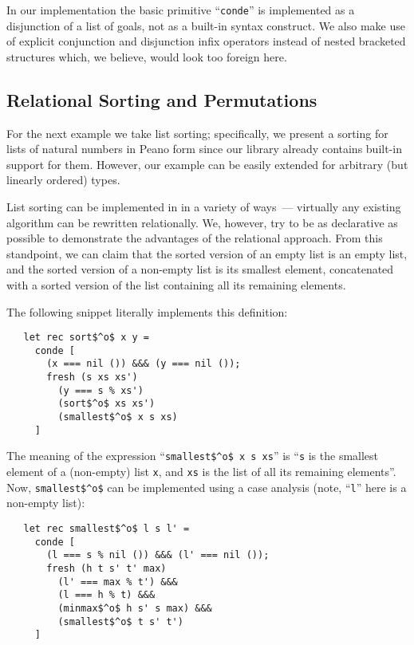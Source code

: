In our implementation the basic \miniKanren primitive ``\lstinline{conde}'' is implemented as a
disjunction of a list of goals, not as a built-in syntax construct. We also make use of explicit
conjunction and disjunction infix operators instead of nested bracketed structures which, we
believe, would look too foreign here.

\subsection{Relational Sorting and Permutations}

For the next example we take list sorting; specifically, we present a sorting for lists of natural numbers
in Peano form since our library already contains built-in support for them. However, our example can be
easily extended for arbitrary (but linearly ordered) types.

List sorting can be implemented in \miniKanren in a variety of ways~--- virtually any existing algorithm can
be rewritten relationally. We, however, try to be as declarative as possible to demonstrate the
advantages of the relational approach. From this standpoint, we can claim that the sorted version of an empty list is an
empty list, and the sorted version of a non-empty list is its smallest element, concatenated with a sorted
version of the list containing all its remaining elements.

The following snippet literally implements this definition:

\begin{lstlisting}
   let rec sort$^o$ x y =
     conde [
       (x === nil ()) &&& (y === nil ());
       fresh (s xs xs')
         (y === s % xs')
         (sort$^o$ xs xs')
         (smallest$^o$ x s xs)
     ]
\end{lstlisting}

The meaning of the expression ``\lstinline{smallest$^o$ x s xs}'' is ``\lstinline{s} is the smallest element of a (non-empty) list \lstinline{x}, and \lstinline{xs} is the
list of all its remaining elements''. Now, \lstinline{smallest$^o$} can be implemented using a case analysis (note, ``\lstinline{l}'' here is a non-empty list):

\begin{lstlisting}
   let rec smallest$^o$ l s l' =
     conde [
       (l === s % nil ()) &&& (l' === nil ());
       fresh (h t s' t' max)
         (l' === max % t') &&&
         (l === h % t) &&&
         (minmax$^o$ h s' s max) &&&
         (smallest$^o$ t s' t')
     ]
\end{lstlisting}

